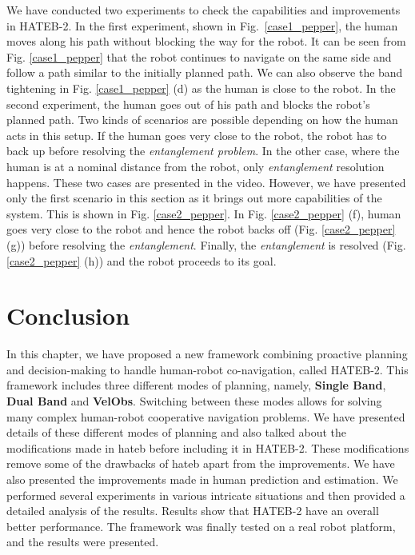 We have conducted two experiments to check the capabilities and improvements in HATEB-2. In the first experiment, shown in Fig.~\ref{case1_pepper}, the human moves along his path without blocking the way for the robot. It can be seen from Fig. \ref{case1_pepper} that the robot continues to navigate on the same side and follow a path similar to the initially planned path. We can also observe the band tightening in Fig. \ref{case1_pepper} (d) as the human is close to the robot. In the second experiment, the human goes out of his path and blocks the robot's planned path. Two kinds of scenarios are possible depending on how the human acts in this setup. If the human goes very close to the robot, the robot has to back up before resolving the \textit{entanglement problem}. In the other case, where the human is at a nominal distance from the robot, only \textit{entanglement} resolution happens. These two cases are presented in the video. However, we have presented only the first scenario in this section as it brings out more capabilities of the system. This is shown in Fig. \ref{case2_pepper}. In Fig. \ref{case2_pepper} (f), human goes very close to the robot and hence the robot backs off (Fig. \ref{case2_pepper} (g)) before resolving the \textit{entanglement}. Finally, the \textit{entanglement} is resolved (Fig. \ref{case2_pepper} (h)) and the robot proceeds to its goal.

\section{Conclusion}\label{conclude_chap3}
In this chapter, we have proposed a new framework combining proactive planning and decision-making to handle human-robot co-navigation, called HATEB-2. This framework includes three different modes of planning, namely, \textbf{Single Band}, \textbf{Dual Band} and \textbf{VelObs}. Switching between these modes allows for solving many complex human-robot cooperative navigation problems. We have presented details of these different modes of planning and also talked about the modifications made in \acrshort{hateb} before including it in HATEB-2. These modifications remove some of the drawbacks of \acrshort{hateb} apart from the improvements. We have also presented the improvements made in human prediction and estimation. We performed several experiments in various intricate situations and then provided a detailed analysis of the results. Results show that HATEB-2 have an overall better performance. The framework was finally tested on a real robot platform, and the results were presented.

